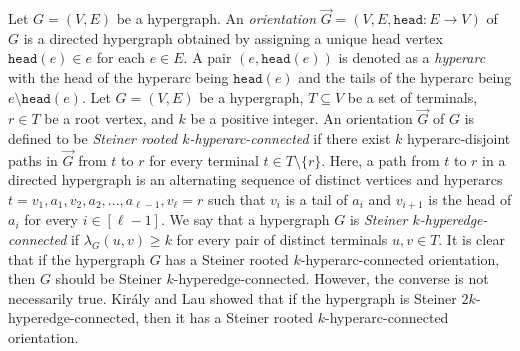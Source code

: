 \documentclass{article}
\newcommand{\knote}[1]{{\color{red}[{\tiny Karthik: \bf #1}]\marginpar{\color{red}*}}}
\newcommand{\head}{\ensuremath{\texttt{head}}\xspace}
\newcommand{\tails}{\ensuremath{\texttt{tails}}\xspace}
\begin{document}
Let $G=(V, E)$ be a hypergraph. An \emph{orientation} $\overrightarrow{G}=(V, E, \head:E\rightarrow V)$ of $G$ is a directed hypergraph obtained by assigning a unique head vertex $\head(e)\in e$ for each $e\in E$. 
A pair $(e, \head(e))$ is denoted as a \emph{hyperarc} with the head of the hyperarc being $\head(e)$ and the tails of the hyperarc being $e\setminus \head(e)$. 
Let $G=(V, E)$ be a hypergraph, $T\subseteq V$ be a set of terminals, $r\in T$ be a root vertex, and $k$ be a positive integer. An orientation $\overrightarrow{G}$ of $G$ is defined to be \emph{Steiner rooted $k$-hyperarc-connected} if there exist $k$ hyperarc-disjoint paths in $\overrightarrow{G}$ 
from $t$ to $r$ 
for every terminal $t\in T\setminus \{r\}$. Here, a path from $t$ to $r$ in a directed hypergraph is an alternating sequence of distinct vertices and hyperarcs $t=v_1, a_1, v_2, a_2, ..., a_{\ell-1}, v_{\ell}=r$ such that 
$v_i$ is a tail of $a_i$ and $v_{i+1}$ is the head of $a_i$ 
for every $i\in [\ell-1]$. We say that a hypergraph $G$ is \emph{Steiner $k$-hyperedge-connected} if 
$\lambda_G(u,v)\ge k$ for 
every pair of distinct terminals $u, v\in T$. 
It is clear that if the hypergraph $G$ has a Steiner rooted $k$-hyperarc-connected orientation, then $G$ should be Steiner $k$-hyperedge-connected. However, the converse is not necessarily true. Kir\'{a}ly and Lau \cite{Kiraly-Lau} showed that if the hypergraph is Steiner $2k$-hyperedge-connected, then it has a Steiner rooted $k$-hyperarc-connected orientation. 
\end{document}

